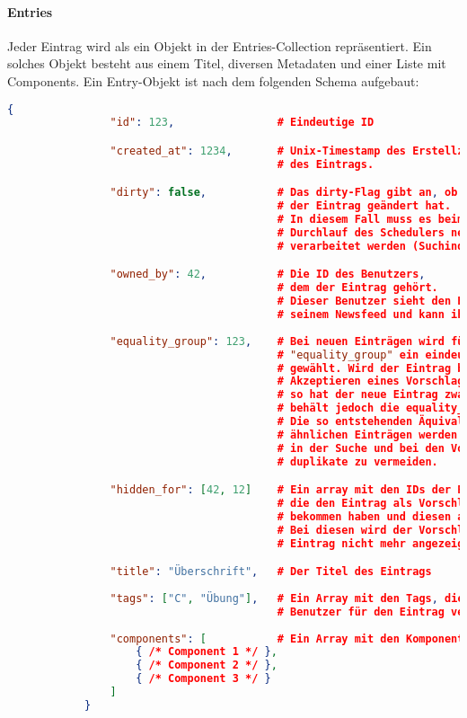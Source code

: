 	\paragraph{Entries} %
	\label{par:entries}
		
		Jeder Eintrag wird als ein Objekt in der Entries-Collection repräsentiert. Ein solches Objekt besteht aus einem Titel, diversen Metadaten und einer Liste mit Components. Ein Entry-Objekt ist nach dem folgenden Schema aufgebaut:

		\begin{lstlisting}[language=JSON]
			{
				"id": 123,                # Eindeutige ID

				"created_at": 1234,       # Unix-Timestamp des Erstellzeitpunktes 
				                          # des Eintrags.

				"dirty": false,           # Das dirty-Flag gibt an, ob sich
				                          # der Eintrag geändert hat.
				                          # In diesem Fall muss es beim nächsten
				                          # Durchlauf des Schedulers neu
				                          # verarbeitet werden (Suchindex, Vorschläge!).

				"owned_by": 42,           # Die ID des Benutzers,
				                          # dem der Eintrag gehört.
				                          # Dieser Benutzer sieht den Eintrag in
				                          # seinem Newsfeed und kann ihn bearbeiten.
				
				"equality_group": 123,    # Bei neuen Einträgen wird für den Wert 
				                          # "equality_group" ein eindeutiger Wert
				                          # gewählt. Wird der Eintrag beim
				                          # Akzeptieren eines Vorschlags geklont,
				                          # so hat der neue Eintrag zwar eine neue ID,
				                          # behält jedoch die equality_group.
				                          # Die so entstehenden Äquivalenzklassen an 
				                          # ähnlichen Einträgen werden dafür genutzt, 
				                          # in der Suche und bei den Vorschlägen
				                          # duplikate zu vermeiden.

				"hidden_for": [42, 12]    # Ein array mit den IDs der Benutzer, die
				                          # die den Eintrag als Vorschlag angezeigt
				                          # bekommen haben und diesen abgelehnt haben.
				                          # Bei diesen wird der Vorschlag für den
				                          # Eintrag nicht mehr angezeigt.

				"title": "Überschrift",   # Der Titel des Eintrags
				
				"tags": ["C", "Übung"],   # Ein Array mit den Tags, die der 
				                          # Benutzer für den Eintrag vergeben hat.
				
				"components": [           # Ein Array mit den Komponenten des Eintrags
					{ /* Component 1 */ },
					{ /* Component 2 */ },
					{ /* Component 3 */ }
				]
			}
		\end{lstlisting}

